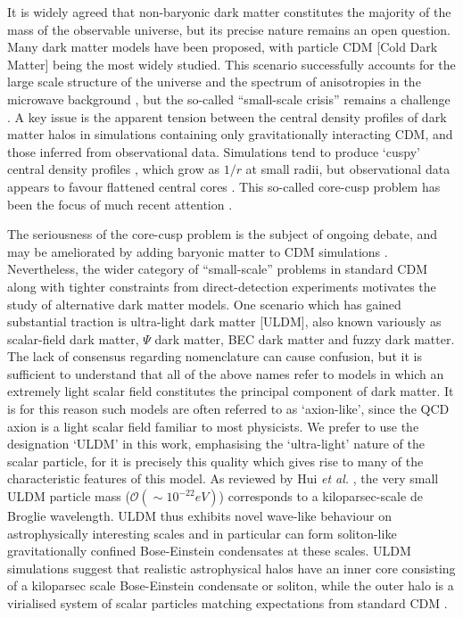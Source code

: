 \documentclass{pasa}%
\begin{document}
It is widely agreed that non-baryonic dark matter constitutes the majority of the mass of the observable universe, but its precise nature remains an open question. Many dark matter models have been proposed, with particle CDM [Cold Dark Matter]  being the most widely studied. This scenario successfully accounts for the large scale structure of the universe \cite{Springel:2005nw} and the spectrum of anisotropies in the microwave background \cite{deBernardis:2000sbo, Hanany:2000qf, Halverson:2001yy, Netterfield:2001yq, Lee:2001yp, Ade:2015xua,  Hu:2001bc}, but the so-called ``small-scale crisis''  remains a challenge \cite{Weinberg:2013aya}. A key issue is the apparent tension between the  central density profiles of dark matter halos in simulations containing only gravitationally interacting CDM, and those inferred from observational data. Simulations tend to produce `cuspy' central density profiles \cite{Navarro:1995iw}, which grow as $1/r$ at small radii, but observational data appears to favour flattened central cores \cite{Moore:1994yx}. This so-called core-cusp problem has been the focus of much recent attention \cite{Dutton:2018nop, Read:2018pft, Genina:2018}. 
 
The seriousness of the core-cusp problem is the subject of ongoing debate, and may be ameliorated by adding baryonic matter to CDM simulations \cite{Benitez-Llambay:2018}. Nevertheless, the wider category of  ``small-scale'' problems in standard CDM along with tighter constraints from direct-detection experiments \cite{Schumann:2019eaa} motivates the study of alternative dark matter models. One scenario which has gained substantial traction is ultra-light dark matter [ULDM], also known variously as scalar-field dark matter, $\Psi$ dark matter, BEC dark matter and fuzzy dark matter. The lack of consensus regarding nomenclature can cause confusion, but it is sufficient to understand that all of the above names refer to models in which an extremely light scalar field constitutes the principal component of dark matter. It is for this reason such models are often referred to as `axion-like', since the QCD axion is a light scalar field familiar to most physicists. We prefer to use the designation `ULDM' in this work, emphasising the `ultra-light' nature of the scalar particle, for it is precisely this quality which gives rise to many of the characteristic features of this model.
As reviewed by Hui {\em et al.\/} \cite{Hui:2016ltb}, the very small ULDM particle mass ($\mathcal{O}(\sim 10^{-22}eV)$) corresponds to a kiloparsec-scale de Broglie wavelength. ULDM thus exhibits novel wave-like behaviour on astrophysically interesting scales and in particular can form soliton-like gravitationally confined Bose-Einstein condensates at these scales. ULDM simulations suggest that realistic astrophysical halos have an inner core consisting of a kiloparsec scale Bose-Einstein condensate or soliton, while the outer halo is a virialised system of scalar particles matching expectations from standard CDM \cite{Schwabe:2016rze, Veltmaat:2018dfz}. 
\end{document}

